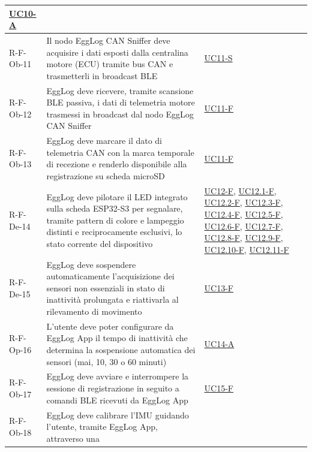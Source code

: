 \begin{center}
\begin{longtable}{|p{2cm}|p{8.5cm}|p{1.75cm}|}
    \hyperref[uc:uc_gestione_sd_assente_avvio]{UC10-A} \\
    \hline
    R-F-Ob-11\label{req:rf21} & Il nodo EggLog CAN Sniffer deve acquisire i dati esposti dalla centralina
    motore (ECU) tramite bus CAN e trasmetterli in broadcast BLE &
    \hyperref[uc:uc_acquisizione_can_sniffer]{UC11-S} \\
    \hline
    R-F-Ob-12\label{req:rf11} & EggLog deve ricevere, tramite scansione BLE passiva, i dati di telemetria
    motore trasmessi in broadcast dal nodo EggLog CAN Sniffer &
    \hyperref[uc:uc_lettura_can_ecu]{UC11-F} \\
    \hline
    R-F-Ob-13\label{req:rf22} & EggLog deve marcare il dato di telemetria CAN con la marca temporale di recezione 
    e renderlo disponibile alla registrazione su scheda microSD &
    \hyperref[uc:uc_lettura_can_ecu]{UC11-F} \\
    \hline
    R-F-De-14\label{req:rf12} & EggLog deve pilotare il LED integrato sulla scheda ESP32-S3 per segnalare, tramite
    pattern di colore e lampeggio distinti e reciprocamente esclusivi, lo stato corrente del
    dispositivo & \hyperref[uc:uc_stato_led]{UC12-F}, \hyperref[uc:uc_led_sd_mancante]{UC12.1-F},
    \hyperref[uc:uc_led_errore]{UC12.2-F}, \hyperref[uc:uc_led_pairing_wifi]{UC12.3-F},
    \hyperref[uc:uc_led_pairing_ble]{UC12.4-F}, \hyperref[uc:uc_led_recupero_calibrazione]{UC12.5-F},
    \hyperref[uc:uc_led_calibrazione]{UC12.6-F}, \hyperref[uc:uc_led_download]{UC12.7-F},
    \hyperref[uc:uc_led_eliminazione]{UC12.8-F}, \hyperref[uc:uc_led_sospensione]{UC12.9-F},
    \hyperref[uc:uc_led_logging]{UC12.10-F}, \hyperref[uc:uc_led_standby]{UC12.11-F} \\
    \hline
    R-F-De-15\label{req:rf13} & EggLog deve sospendere automaticamente l'acquisizione dei sensori non essenziali in
    stato di inattività prolungata e riattivarla al rilevamento di movimento &
    \hyperref[uc:uc_sospensione_sensori]{UC13-F} \\
    \hline
    R-F-Op-16\label{req:rf14} & L'utente deve poter configurare da EggLog App il tempo di inattività che determina
    la sospensione automatica dei sensori (mai, 10, 30 o 60 minuti) &
    \hyperref[uc:uc_config_timeout]{UC14-A} \\
    \hline
    R-F-Ob-17\label{req:rf15} & EggLog deve avviare e interrompere la sessione di registrazione in seguito a comandi
    BLE ricevuti da EggLog App & \hyperref[uc:uc_sessione_ble]{UC15-F} \\
    \hline
    R-F-Ob-18\label{req:rf16} & EggLog deve calibrare l'IMU guidando l'utente, tramite EggLog App, attraverso una

\end{longtable}
\end{center}
